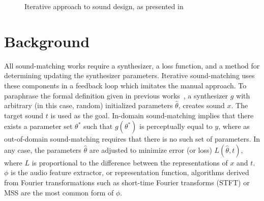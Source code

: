 \documentclass{article} %
\begin{document}
\begin{figure}[ht]
    \centering
{}
    \caption{ Iterative approach to sound design, as presented in~\cite{salimi2025soundmatching}}
    \label{fig:sound_design_loop_iterative}
\end{figure}

\section{Background}
All sound-matching works require a synthesizer, a loss function, and a method for determining updating the synthesizer parameters. Iterative sound-matching uses these components in a feedback loop which imitates the manual approach. To paraphrase the formal definition given in previous works~\cite{salimi2025soundmatching,vahidi2023mesostructures,han2023perceptual}, a synthesizer $g$ with arbitrary (in this case, random) initialized parameters $\hat{\theta}$, creates sound $x$. The target sound $t$ is used as the goal. In-domain sound-matching implies that there exists a parameter set $\theta^*$ such that $g(\theta^*)$ is perceptually equal to $y$, where as out-of-domain sound-matching requires that there is no such set of parameters. In any case, the parameters $\hat{\theta}$ are adjusted to minimize error (or loss) $L(\hat{\theta},t)$, where $L$ is proportional to the difference between the representations of $x$ and $t$. $\phi$ is the audio feature extractor, or representation function, algorithms derived from Fourier transformations such as short-time Fourier transforms (STFT) or MSS are the most common form of $\phi$.
\end{document}
